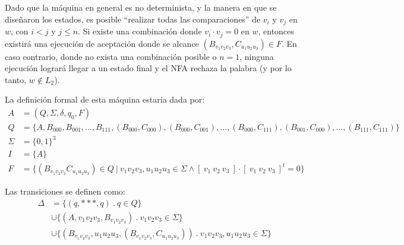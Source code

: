 \documentclass[letter]{article}
\begin{document}
\begin{pregunta}{2}
Dado que la máquina en general es no determinista, y la manera en que se diseñaron los estados, es posible ``realizar todas las comparaciones'' de $v_i$ y $v_j$ en $w$, con $i < j$ y $ j \leq n$. Si existe una combinación donde $v_i \cdot v_j = 0$ en $w$, entonces existirá una ejecución de aceptación donde se alcance $(B_{v_1v_2v_3}, C_{u_1u_2u_3}) \in F$. En caso contrario, donde no exista una combinación posible o $n = 1$, ninguna ejecución logrará llegar a un estado final y el NFA rechaza la palabra (y por lo tanto, $w \notin L_2$).

La definición formal de esta máquina estaría dada por:
\begin{align*}
    A & = (Q, \Sigma, \delta, q_0, F) \\
    Q & = \{ A, B_{000}, B_{001}, ..., B_{111}, (B_{000}, C_{000}), (B_{000}, C_{001}), ..., (B_{000}, C_{111}), (B_{001}, C_{000}), ..., (B_{111}, C_{111})  \} \\
    \Sigma & = \{ 0, 1 \}^3 \\
    I & = \{ A \} \\
    F & = \{ (B_{v_1v_2v_3}C_{u_1u_2u_3}) \in Q \ | \  v_1v_2v_3, u_1u_2u_3 \in \Sigma \land [ \ v_1 \ v_2 \ v_3 \ ] \cdot [ \ v_1 \ v_2 \ v_3 \ ]^t = 0\}
\end{align*}

Las transiciones se definen como:
\begin{align*}
    \Delta & = \{ (q, ***, q) \ . \ q \in Q \} \\
    & \cup \{ (A, v_1v_2v_3, B_{v_1v_2v_3}) \ . \ v_1v_2v_3 \in \Sigma \} \\
    & \cup \{ (B_{v_1v_2v_3}, u_1u_2u_3, (B_{v_1v_2v_3}, C_{u_1u_2u_3})) \ . \ v_1v_2v_3, u_1u_2u_3 \in \Sigma \} \\
\end{align*}
	
\end{pregunta}
\end{document}
